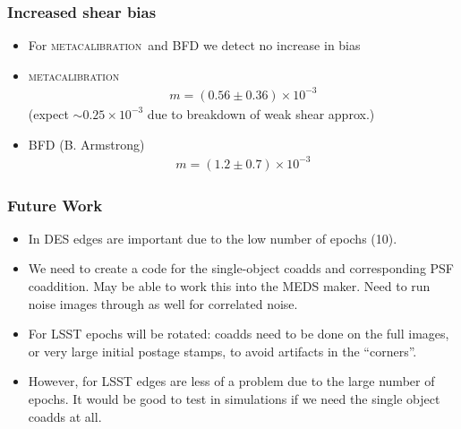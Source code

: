 \documentclass{beamer}
\newcommand{\mcal}{\textsc{metacalibration}}
\begin{document}
\frame
{
    \frametitle{Increased shear bias}

 
    \begin{itemize}

        \item For \mcal\ and BFD we detect no increase in bias
        \item \mcal 
            \begin{align}
            m = (0.56 \pm 0.36) \times 10^{-3}
            \end{align}
            (expect $\sim 0.25 \times 10^{-3}$ due to breakdown of weak shear approx.)

        \item BFD (B. Armstrong)
            \begin{align}
                m = (1.2 \pm 0.7) \times 10^{-3}
            \end{align}



    \end{itemize}

}

\frame
{
    \frametitle{Future Work}

 
 
    \begin{itemize}

        \item In DES edges are important due to the low number of epochs (10).

        \item We need to create a code for the single-object coadds and
            corresponding PSF coaddition.  May be able to work this into the
            MEDS maker.  Need to run noise images through as well for
            correlated noise.

        \item For LSST epochs will be rotated: coadds need to be done on the
            full images, or very large initial postage stamps,  to avoid
            artifacts in the ``corners''.

        \item However, for LSST edges are less of a problem due to the large
            number of epochs.  It would be good to test in simulations if we
            need the single object coadds at all.

    \end{itemize}

}
\end{document}
